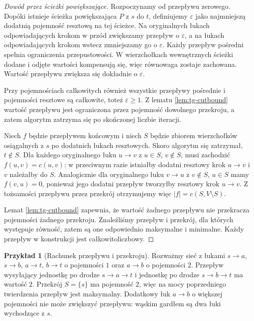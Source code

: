 \documentclass[11pt,a4paper]{report}
\numberwithin{equation}{section}
\theoremstyle{plain}
\theoremstyle{definition}
\newtheorem{przyklad}[twierdzenie]{Przykład}
\theoremstyle{remark}
\begin{document}
\begin{proof}[Dowód przez ścieżki powiększające]
Rozpoczynamy od przepływu zerowego. Dopóki istnieje
ścieżka powiększająca $P$ z $s$ do $t$, definiujemy
$\varepsilon$ jako najmniejszą dodatnią pojemność resztową
na tej ścieżce. Na oryginalnych łukach odpowiadających
krokom w przód zwiększamy przepływ o $\varepsilon$,
a na łukach odpowiadających krokom wstecz zmniejszamy
go o $\varepsilon$. Każdy przepływ pośredni spełnia
ograniczenia przepustowości. W wierzchołkach wewnętrznych
ścieżki dodane i odjęte wartości kompensują się,
więc równowaga zostaje zachowana. Wartość przepływu
zwiększa się dokładnie o $\varepsilon$.

Przy pojemnościach całkowitych również wszystkie przepływy
pośrednie i pojemności resztowe są całkowite, toteż
$\varepsilon\ge1$. Z lematu \ref{lem:tg-cutbound}
wartość przepływu jest ograniczona przez pojemność
dowolnego przekroju, a zatem algorytm zatrzyma się
po skończonej liczbie iteracji.

Niech $f$ będzie przepływem końcowym i niech $S$ będzie
zbiorem wierzchołków osiągalnych z $s$ po dodatnich
łukach resztowych. Skoro algorytm się zatrzymał, $t\notin S$.
Dla każdego oryginalnego łuku $u\to v$ z $u\in S$,
$v\notin S$, musi zachodzić $f(u,v)=c(u,v)$:
w przeciwnym razie istniałby dodatni resztowy krok
$u\to v$ i $v$ należałby do $S$.
Analogicznie dla oryginalnego łuku $v\to u$ z $v\notin S$,
$u\in S$ mamy $f(v,u)=0$, ponieważ jego dodatni przepływ
tworzyłby resztowy krok $u\to v$.
Z tożsamości przepływu przez przekrój otrzymujemy więc
$|f|=c(S,V\setminus S)$.

Lemat \ref{lem:tg-cutbound} zapewnia, że wartość żadnego
przepływu nie przekracza pojemności żadnego przekroju.
Znaleźliśmy przepływ i przekrój, dla których występuje
równość, zatem są one odpowiednio maksymalne i minimalne.
Każdy przepływ w konstrukcji jest całkowitoliczbowy.
\end{proof}

\begin{przyklad}[Rachunek przepływu i przekroju]
Rozważmy sieć z łukami $s\to a$, $s\to b$, $a\to t$,
$b\to t$ o pojemności $1$ oraz $a\to b$ o pojemności $2$.
Przepływ wysyłający jednostkę po drodze $s\to a\to t$
i jednostkę po drodze $s\to b\to t$ ma wartość $2$.
Przekrój $S=\{s\}$ ma pojemność $2$, więc na mocy
poprzedniego twierdzenia przepływ jest maksymalny.
Dodatkowy łuk $a\to b$ o większej pojemności
nie może zwiększyć przepływu: wąskim gardłem
są dwa łuki wychodzące z $s$.
\end{przyklad}
\end{document}
